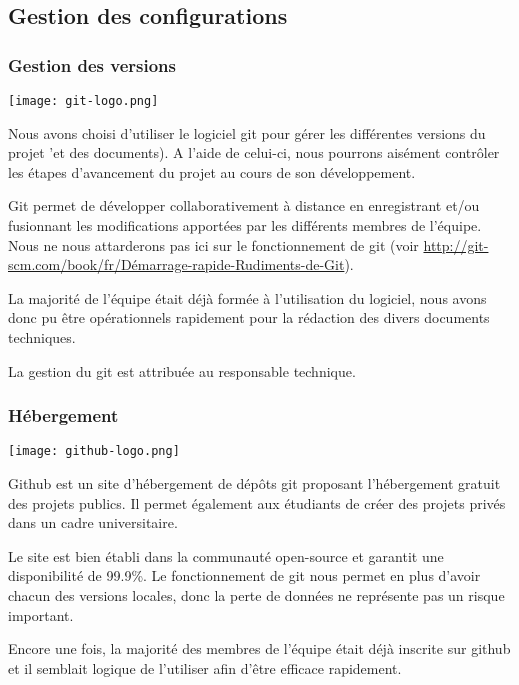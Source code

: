 \documentclass{../../res/univ-projet}
\begin{document}
\subsection{Gestion des configurations}
\subsubsection{Gestion des versions}
\texttt{[image: git-logo.png]}

Nous avons choisi d'utiliser le logiciel git pour gérer les différentes versions du projet 'et des documents). A l'aide de celui-ci, nous pourrons aisément contrôler les étapes d'avancement du projet au cours de son développement. 

Git permet de développer collaborativement à distance en enregistrant et/ou fusionnant les modifications apportées par les différents membres de l'équipe. Nous ne nous attarderons pas ici sur le fonctionnement de git (voir \href{http://git-scm.com/book/fr/Démarrage-rapide-Rudiments-de-Git}{http://git-scm.com/book/fr/Démarrage-rapide-Rudiments-de-Git}).

La majorité de l'équipe était déjà formée à l'utilisation du logiciel, nous avons donc pu être opérationnels rapidement pour la rédaction des divers documents techniques.

La gestion du git est attribuée au responsable technique.

\subsubsection{Hébergement}
\texttt{[image: github-logo.png]}

Github est un site d'hébergement de dépôts git proposant l'hébergement gratuit des projets publics. Il permet également aux étudiants de créer des projets privés dans un cadre universitaire.

Le site est bien établi dans la communauté open-source et garantit une disponibilité de 99.9\%. Le fonctionnement de git nous permet en plus d'avoir chacun des versions locales, donc la perte de données ne représente pas un risque important.

Encore une fois, la majorité des membres de l'équipe était déjà inscrite sur github et il semblait logique de l'utiliser afin d'être efficace rapidement. 
\end{document}

